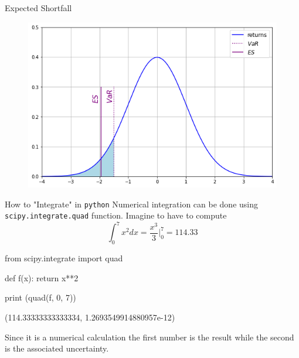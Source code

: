\documentclass{beamer}
\begin{document}
\begin{frame}{Expected Shortfall}
  \begin{figure}[h]
    \begin{center}
      \includegraphics[width=0.5\linewidth]{es}
    \end{center}
  \end{figure}
\end{frame}

\begin{frame}[fragile]{How to "Integrate" in \texttt{python}}
  Numerical integration can be done using \texttt{scipy.integrate.quad} function. Imagine to have to compute
  \begin{equation*}
    \int_{0}^{7} x^2 dx = \frac{x^3}{3}\bigg|_0^7 = 114.33
  \end{equation*}
  \begin{ipython}
from scipy.integrate import quad

def f(x):
  return x**2

print (quad(f, 0, 7))   
\end{ipython}
  \begin{ioutput}
(114.33333333333334, 1.2693549914880957e-12)
\end{ioutput}
Since it is a numerical calculation the first number is the result while the second is the associated uncertainty. 
\end{frame}
\end{document}
